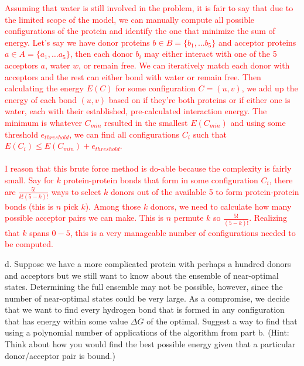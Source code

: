 \documentclass[11pt]{article}
\begin{document}
\textcolor{red}{
Assuming that water is still involved in the problem, it is fair to say that due to the limited scope of the model, we can manually compute all possible configurations of the protein and identify the one that minimize the sum of energy. Let's say we have donor proteins $b \in B = \{b_1, \ldots b_5\}$ and acceptor proteins $a \in A = \{a_1, \ldots a_5\}$, then each donor $b_i$ may either interact with one of the 5 acceptors $a$, water $w$, or remain free. We can iteratively match each donor with acceptors and the rest can either bond with water or remain free. Then calculating the energy $E(C)$ for some configuration $C=(u, v)$, we add up the energy of each bond $(u, v)$ based on if they're both proteins or if either one is water, each with their established, pre-calculated interaction energy. The minimum is whatever $C_{min}$ resulted in the smallest $E(C_{min})$ and using some threshold $e_{threshold}$, we can find all configurations $C_i$ such that $E(C_i) \le E(C_{min}) + e_{threshold}$.\\\\
I reason that this brute force method is do-able because the complexity is fairly small. Say for $k$ protein-protein bonds that form in some configuration $C_i$, there are $\frac{5!}{k!(5-k)!}$ ways to select $k$ donors out of the available 5 to form protein-protein bonds (this is $n$ pick $k$). Among those $k$ donors, we need to calculate how many possible acceptor pairs we can make. This is $n$ permute $k$ so $\frac{5!}{(5-k)!}$. Realizing that $k$ spans $0-5$, this is a very manageable number of configurations needed to be computed.
}

d. Suppose we have a more complicated protein with perhaps a hundred
donors and acceptors but we still want to know about the ensemble of
near-optimal states.  Determining the full ensemble may not be
possible, however, since the number of near-optimal states could be
very large.  As a compromise, we decide that we want to find every
hydrogen bond that is formed in any configuration that has energy
within some value $\Delta G$ of the optimal.  Suggest a way to find
that using a polynomial number of applications of the algorithm from
part b.  (Hint: Think about how you would find the best possible
energy given that a particular donor/acceptor pair is bound.)
\end{document}
